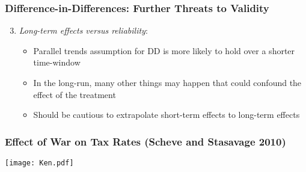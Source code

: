 \documentclass{beamer}
\numberwithin{equation}{section}
\begin{document}
\begin{frame}
  \frametitle{Difference-in-Differences:  Further Threats to Validity}

\begin{enumerate}
\setcounter{enumi}{2}
\item \emph{Long-term effects versus reliability}:
\begin{itemize}\medskip
  \item Parallel trends assumption for DD is more likely to hold over
a shorter time-window\medskip
\item In the long-run, many other things may happen that could confound the effect of the treatment\medskip
\item Should be cautious to extrapolate short-term effects to long-term effects
\end{itemize}
\end{enumerate}
\end{frame}

\begin{frame}
  \frametitle{Effect of War on Tax Rates (Scheve and Stasavage 2010)}
  \vspace{-.06in}
\begin{center}
  \texttt{[image: Ken.pdf]}
\end{center}  \vspace{-.0in}
\end{frame}

%
%
\end{document}
